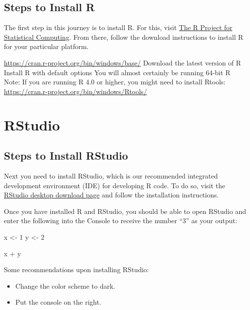 \documentclass[
]{book}
\newenvironment{Shaded}{\begin{snugshade}}{\end{snugshade}}
\newcommand{\DecValTok}[1]{\textcolor[rgb]{0.00,0.00,0.81}{#1}}
\newcommand{\NormalTok}[1]{#1}
\newcommand{\OtherTok}[1]{\textcolor[rgb]{0.56,0.35,0.01}{#1}}
\newcommand{\SpecialCharTok}[1]{\textcolor[rgb]{0.00,0.00,0.00}{#1}}
\providecommand{\tightlist}{%
  \setlength{\itemsep}{0pt}\setlength{\parskip}{0pt}}
\begin{document}
\hypertarget{steps-to-install-r}{%
\subsection{Steps to Install R}\label{steps-to-install-r}}

The first step in this journey is to install R. For this, visit \href{https://www.r-project.org/}{The R Project for Statistical Computing}. From there, follow the download instructions to install R for your particular platform.

\url{https://cran.r-project.org/bin/windows/base/}
Download the latest version of R
Install R with default options
You will almost certainly be running 64-bit R
Note: If you are running R 4.0 or higher, you might need to install Rtools:
\url{https://cran.r-project.org/bin/windows/Rtools/}

\hypertarget{rstudio}{%
\section{RStudio}\label{rstudio}}

\hypertarget{steps-to-install-rstudio}{%
\subsection{Steps to Install RStudio}\label{steps-to-install-rstudio}}

Next you need to install RStudio, which is our recommended integrated development environment (IDE) for developing R code. To do so, visit the \href{https://rstudio.com/products/rstudio/download/}{RStudio desktop download page} and follow the installation instructions.

Once you have installed R and RStudio, you should be able to open RStudio and enter the following into the Console to receive the number ``3'' as your output:

\begin{Shaded}
\begin{Highlighting}[]
\NormalTok{x }\OtherTok{\textless{}{-}} \DecValTok{1}
\NormalTok{y }\OtherTok{\textless{}{-}} \DecValTok{2}

\NormalTok{x }\SpecialCharTok{+}\NormalTok{ y}
\end{Highlighting}
\end{Shaded}

Some recommendations upon installing RStudio:

\begin{itemize}
\tightlist
\item
  Change the color scheme to dark.
\item
  Put the console on the right.
\end{itemize}
\end{document}
